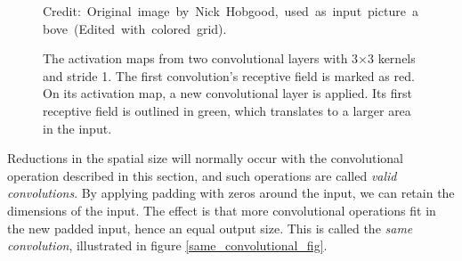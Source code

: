  
    
    \begin{figure}[H]
        \centering
        
        
        \caption[Receptive field]{The activation maps from two convolutional layers with 3×3 kernels and stride 1. The first convolution's receptive field is marked as red. On its activation map, a new convolutional layer is applied. Its first receptive field is outlined in green, which translates to a larger area in the input.}
      	\medskip 
        \hspace*{15pt}\hbox{\scriptsize Credit: Original image by Nick Hobgood\cite{clownfish_image}, used as input picture above (Edited with colored grid).}
        \label{receptive_field_fig}
    \end{figure}

    
    Reductions in the spatial size will normally occur with the convolutional operation described in this section, and such operations are called \textit{valid convolutions}\cite{o2015introduction_convolutions}. By applying padding with zeros around the input, we can retain the dimensions of the input. The effect is that more convolutional operations fit in the new padded input, hence an equal output size. This is called the \textit{same convolution}, illustrated in figure \ref{same_convolutional_fig}.
    
